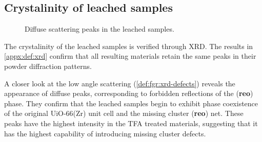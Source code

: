 
\subsection{Crystalinity of leached samples}\label{def:xrd}

\begin{wrapfigure}[15]{r}{0.3\textwidth}
    \centering
    \captionsetup{format=plain}
    \caption{Diffuse scattering peaks in the  leached 
    samples.}%
    \label{def:fgr:xrd-defects}
\end{wrapfigure}

The crystalinity of the leached samples is verified through 
XRD. The results in \autoref{appx:def:xrd} confirm that all 
resulting materials retain the same peaks in their powder
diffraction patterns.

A closer look at the low angle scattering (\autoref{def:fgr:xrd-defects})
reveals the appearance of diffuse peaks, corresponding to forbidden
reflections of the (\textbf{reo}) phase. They confirm that the 
leached samples begin to exhibit phase coexistence of 
the original UiO-66(Zr) unit cell and the missing cluster
(\textbf{reo}) net. These peaks have the highest intensity in 
the TFA treated materials, suggesting that it has the highest 
capability of introducing missing cluster defects.